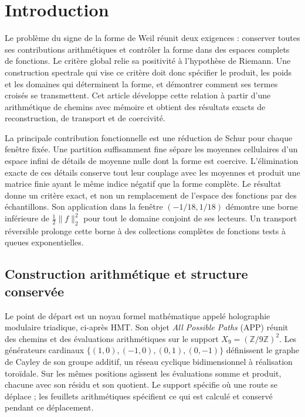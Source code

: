 \section{Introduction}

Le problème du signe de la forme de Weil réunit deux exigences :
conserver toutes ses contributions arithmétiques et contrôler la forme
dans des espaces complets de fonctions. Le critère global relie
sa positivité à l’hypothèse de Riemann. Une construction
spectrale qui vise ce critère doit donc spécifier
le produit, les poids et les domaines qui déterminent la forme,
et démontrer comment ses termes croisés se transmettent. Cet
article développe cette relation à partir d’une arithmétique de chemins
avec mémoire et obtient des résultats exacts de reconstruction,
de transport et de coercivité.

La principale contribution fonctionnelle est une réduction de Schur pour chaque fenêtre fixée. Une partition suffisamment fine sépare les moyennes cellulaires d'un espace infini de détails de moyenne nulle dont la forme est coercive. L'élimination exacte de ces détails conserve tout leur couplage avec les moyennes et produit une matrice finie ayant le même indice négatif que la forme complète. Le résultat donne un critère exact, et non un remplacement de l'espace des fonctions par des échantillons. Son application dans la fenêtre $(-1/18,1/18)$ démontre une borne inférieure de $\frac12\|f\|_2^2$ pour tout le domaine conjoint de ses lecteurs. Un transport réversible prolonge cette borne à des collections complètes de fonctions tests à queues exponentielles.

\subsection*{Construction arithmétique et structure conservée}

Le point de départ est un noyau formel mathématique appelé
holographie modulaire triadique, ci-après HMT. Son objet
\emph{All Possible Paths} (APP) réunit des chemins et des évaluations
arithmétiques sur le support $X_9=(\mathbb Z/9\mathbb Z)^2$.
Les générateurs cardinaux $\{(1,0),(-1,0),(0,1),(0,-1)\}$
définissent le graphe de Cayley de son groupe additif, un réseau
cyclique bidimensionnel à réalisation toroïdale. Sur les mêmes
positions agissent les évaluations somme et produit, chacune
avec son résidu et son quotient. Le support spécifie où une
route se déplace ; les feuillets arithmétiques spécifient ce qui est
calculé et conservé pendant ce déplacement.

